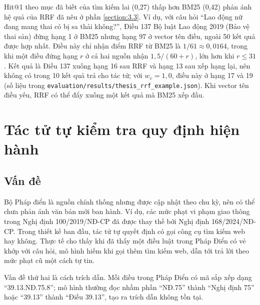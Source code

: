 \documentclass[../DoAn.tex]{subfiles}
\begin{document}
Hit@1 theo mục đã biết của tìm kiếm lai (0,27) thấp hơn BM25 (0,42) phản ánh hệ quả của RRF đã nêu ở phần \ref{section:3.3}. Ví dụ, với câu hỏi ``Lao động nữ đang mang thai có bị sa thải không?'', Điều 137 Bộ luật Lao động 2019 (Bảo vệ thai sản) đứng hạng 1 ở BM25 nhưng hạng 97 ở vector tên điều, ngoài 50 kết quả được hợp nhất. Điều này chỉ nhận điểm RRF từ BM25 là $1/61 \approx 0{,}0164$, trong khi một điều đứng hạng $r$ ở cả hai nguồn nhận $1{,}5/(60 + r)$, lớn hơn khi $r \le 31$. Kết quả là Điều 137 xuống hạng 16 sau RRF và hạng 13 sau xếp hạng lại, nên không có trong 10 kết quả trả cho tác tử; với $w_{v} = 1{,}0$, điều này ở hạng 17 và 19 (số liệu trong \texttt{evaluation/\allowbreak{}results/\allowbreak{}thesis\_rrf\_example.json}). Khi vector tên điều yếu, RRF có thể đẩy xuống một kết quả mà BM25 xếp đầu.

\section{Tác tử tự kiểm tra quy định hiện hành}
\label{section:5.2}

\subsection{Vấn đề}
Bộ Pháp điển là nguồn chính thống nhưng được cập nhật theo chu kỳ, nên có thể chưa phản ánh văn bản mới ban hành. Ví dụ, các mức phạt vi phạm giao thông trong Nghị định 100/2019/NĐ-CP đã được thay thế bởi Nghị định 168/2024/NĐ-CP. Trong thiết kế ban đầu, tác tử tự quyết định có gọi công cụ tìm kiếm web hay không. Thực tế cho thấy khi đã thấy một điều luật trong Pháp Điển có vẻ khớp với câu hỏi, mô hình hiếm khi gọi thêm tìm kiếm web, dẫn tới trả lời theo mức phạt cũ một cách tự tin.

Vấn đề thứ hai là cách trích dẫn. Mỗi điều trong Pháp Điển có mã sắp xếp dạng ``39.13.NĐ.75.8''; mô hình thường đọc nhầm phần ``NĐ.75'' thành ``Nghị định 75'' hoặc ``39.13'' thành ``Điều 39.13'', tạo ra trích dẫn không tồn tại.
\end{document}
